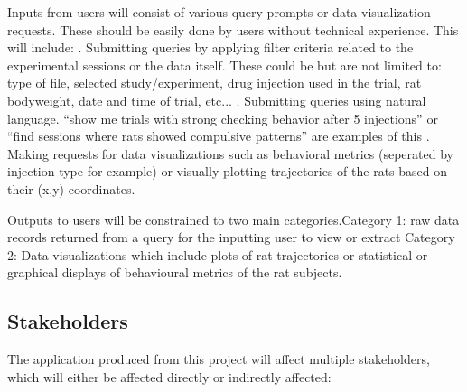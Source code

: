 \documentclass{article}
\begin{document}

\par{Inputs from users will consist of various query prompts or data visualization requests. These should be easily done
by users without technical experience. This will include: \newline \newline {}. Submitting queries by applying filter criteria related to the experimental sessions or the data itself.
These could be but are not limited to: type of file, selected study/experiment, drug injection used in the trial,
rat bodyweight, date and time of trial, etc... \newline \newline {}. Submitting queries using natural language. “show me trials with strong checking behavior after 5 injections”
or “find sessions where rats showed compulsive patterns” are examples of this \newline \newline {}. Making requests for data visualizations such as behavioral metrics (seperated by injection type for example) or visually plotting trajectories of the rats
based on their (x,y) coordinates.}
\newline

\par{Outputs to users will be constrained to two main categories.\newline \newline \indent Category 1: raw data records returned from a query for the inputting user to view or extract
\newline \newline \indent Category 2: Data visualizations which include plots of rat trajectories or statistical or graphical displays of behavioural metrics of the rat subjects.}

\subsection{Stakeholders}

\par{The application produced from this project will affect multiple stakeholders, which will either be affected directly or indirectly affected:}
\end{document}
